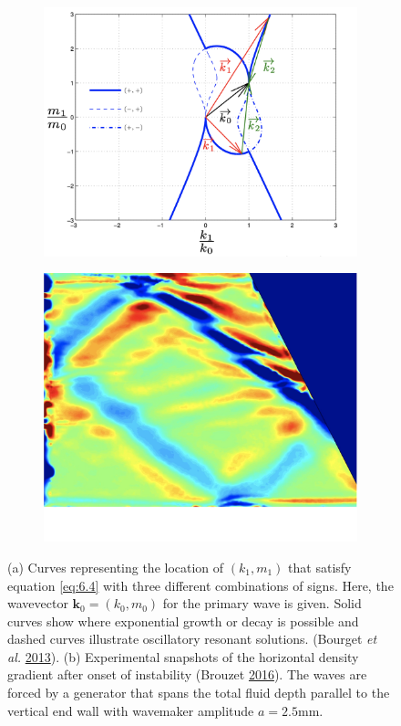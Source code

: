 \documentclass[a4paper]{article}
\numberwithin{equation}{section}
\begin{document}
\begin{figure}[h!]
\centering
\begin{subfigure}[t]{.5\textwidth}
  \centering
  \includegraphics[width=0.9\linewidth]{Images/spatial}
  \caption{}
  \label{fig:sub1}
\end{subfigure}%
\begin{subfigure}[t]{.5\textwidth}
  \centering
  \includegraphics[width=0.81\linewidth]{Images/iwa instability 2}
  \caption{}
  \label{fig:sub2}
\end{subfigure}
\label{fig:9}
\caption{(a) Curves representing the location of $(k_1, m_1)$ that satisfy equation \eqref{eq:6.4} with three different combinations of signs. Here, the wavevector $\mathbf{k}_0 = (k_0, m_0)$ for the primary wave is given. Solid curves show where exponential growth or decay is possible and dashed curves illustrate oscillatory resonant solutions. (Bourget \emph{et al.} \protect\hyperlink{ref 33}{2013}). (b) Experimental snapshots of the horizontal density gradient after onset of instability (Brouzet \protect\hyperlink{ref 9}{2016}). The waves are forced by a generator that spans the total fluid depth parallel to the vertical end wall with wavemaker amplitude $a = 2.5$mm.}
\end{figure}
\end{document}
